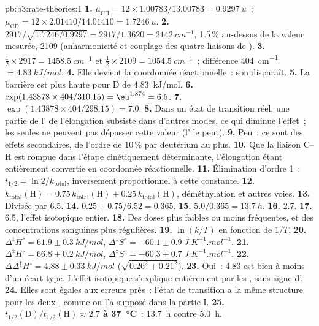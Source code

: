 \begin{solution}{pb:b3:rate-theories:1}
\textbf{1.} $\mu_{\mathrm{CH}} = 12 \times 1.00783/13.00783 = \qty{0.9297}{u}$~; $\mu_{\mathrm{CD}} = 12 \times 2.01410/14.01410 =
\qty{1.7246}{u}$.
\textbf{2.} $2917/\sqrt{1.7246/0.9297} = 2917/1.3620 = \qty{2142}{cm^{-1}}$,
1.5\,\% au-dessus de la valeur
mesurée, 2109 (anharmonicité et couplage des quatre liaisons de
).
\textbf{3.} $\frac12 \times 2917 = \qty{1458.5}{cm^{-1}}$ et $\frac12 \times 2109 = \qty{1054.5}{cm^{-1}}$~;
différence
\qty{404}{cm^{-1}} $= \qty{4.83}{kJ/mol}$.
\textbf{4.} Elle devient la coordonnée réactionnelle~: son  disparaît.
\textbf{5.} La barrière est plus haute pour D de \qty{4.83}{kJ/mol}.
\textbf{6.} $\exp(1.43878 \times 404/310.15) = \eu^{1.874} = 6.5$.
\textbf{7.} $\exp(1.43878 \times 404/298.15) = 7.0$.
\textbf{8.} Dans un état de transition réel, une partie de l' de l'élongation subsiste dans d'autres modes, ce qui diminue
l'effet~; les seules  ne peuvent pas dépasser
cette valeur (l' le peut).
\textbf{9.} Peu~: ce sont des effets secondaires, de l'ordre de 10\,\% par
deutérium au plus.
\textbf{10.} Que la liaison C--H est rompue dans l'étape cinétiquement
déterminante, l'élongation étant entièrement convertie en coordonnée
réactionnelle.
\textbf{11.} Élimination d'ordre 1~: $t_{1/2} = \ln2/k_{\mathrm{total}}$,
inversement proportionnel à cette constante.
\textbf{12.} $k_{\mathrm{total}}(\mathrm H) = 0.75\,k_{\mathrm{total}}(\mathrm H) + 0.25\,k_{\mathrm{total}}(\mathrm H)$,
déméthylation et autres voies.
\textbf{13.} Divisée par 6.5.
\textbf{14.} $0.25 + 0.75/6.52 = 0.365$.
\textbf{15.} $5.0/0.365 = \qty{13.7}{h}$.
\textbf{16.} 2.7.
\textbf{17.} 6.5, l'effet isotopique entier.
\textbf{18.} Des doses plus faibles ou moins fréquentes, et des
concentrations sanguines plus régulières.
\textbf{19.} $\ln(k/T)$ en fonction de $1/T$.
\textbf{20.} $\Delta^{\ddagger}H^\circ = 61.9 \pm \qty{0.3}{kJ/mol}$, $\Delta^{\ddagger}S^\circ = -60.1 \pm \qty{0.9}{J.K^{-1}.mol^{-1}}$.
\textbf{21.} $\Delta^{\ddagger}H^\circ = 66.8 \pm \qty{0.2}{kJ/mol}$, $\Delta^{\ddagger}S^\circ = -60.3 \pm \qty{0.7}{J.K^{-1}.mol^{-1}}$.
\textbf{22.} $\Delta\Delta^{\ddagger}H^\circ = 4.88 \pm \qty{0.33}{kJ/mol}$ ($\sqrt{0.26^2 + 0.21^2}$).
\textbf{23.} Oui~: 4.83 est bien à moins d'un écart-type. L'effet
isotopique s'explique entièrement par les , sans
signe d'.
\textbf{24.} Elles sont égales aux erreurs près~: l'état de transition a
la même structure pour les deux , comme on l'a supposé dans
la partie I.
\textbf{25.} \textbf{$t_{1/2}(\mathrm D)/t_{1/2}(\mathrm H) \approx 2.7$
à \qty{37}{\celsius}}~: \qty{13.7}{h} contre \qty{5.0}{h}.
\end{solution}
